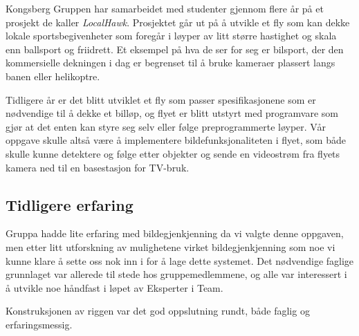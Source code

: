 Kongsberg Gruppen har samarbeidet med studenter gjennom flere år på et prosjekt de kaller \emph{LocalHawk}. Prosjektet går ut på å utvikle et fly som kan dekke lokale sportsbegivenheter som foregår i løyper av litt større hastighet og skala enn ballsport og friidrett. Et eksempel på hva de ser for seg er bilsport, der den kommersielle dekningen i dag er begrenset til å bruke kameraer plassert langs banen eller helikoptre.

Tidligere år er det blitt utviklet et fly som passer spesifikasjonene som er nødvendige til å dekke et billøp, og flyet er blitt utstyrt med programvare som gjør at det enten kan styre seg selv eller følge preprogrammerte løyper. Vår oppgave skulle altså være å implementere bildefunksjonaliteten i flyet, som både skulle kunne detektere og følge etter objekter og sende en videostrøm fra flyets kamera ned til en basestasjon for TV-bruk.

\subsection{Tidligere erfaring}

Gruppa hadde lite erfaring med bildegjenkjenning da vi valgte denne oppgaven, men etter litt utforskning av mulighetene virket bildegjenkjenning som noe vi kunne klare å sette oss nok inn i for å lage dette systemet. Det nødvendige faglige grunnlaget var allerede til stede hos gruppemedlemmene, og alle var interessert i å utvikle noe håndfast i løpet av Eksperter i Team.

Konstruksjonen av riggen var det god oppslutning rundt, både faglig og erfaringsmessig.
